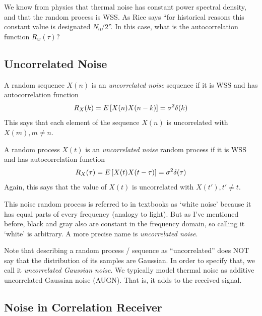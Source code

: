
We know from physics that thermal noise has constant power spectral density, and that the random process is WSS.  As Rice says ``for historical reasons this constant value is designated $N_0/2$''.  In this case, what is the autocorrelation function $R_w(\tau)$?


\subsection{Uncorrelated Noise}

A random sequence $X(n)$ is an \emph{uncorrelated noise} sequence if it is WSS and has autocorrelation function
\[
  R_X(k) = E_{}\left[ {X(n)X(n-k)} \right] = \sigma^2 \delta(k)
\]
This says that each element of the sequence $X(n)$  is uncorrelated with $X(m), m\neq n$.

A random process $X(t)$ is an \emph{uncorrelated noise} random process if it is WSS and has autocorrelation function
\[
  R_X(\tau) = E_{}\left[ {X(t)X(t-\tau)} \right] = \sigma^2 \delta(\tau)
\]
Again, this says that the value of $X(t)$  is uncorrelated with $X(t'), t'\neq t$.


This noise random process is referred to in textbooks as `white noise' because it has equal parts of every frequency (analogy to light).  But as I've mentioned before, black and gray also are constant in the frequency domain, so calling it `white' is arbitrary.  A more precise name is \emph{uncorrelated noise}.

Note that describing a random process / sequence as ``uncorrelated'' does NOT say that the distribution of its samples are Gaussian.  In order to specify that, we call it \emph{uncorrelated Gaussian noise}.  We typically model thermal noise as additive uncorrelated Gaussian noise (AUGN).  That is, it adds to the received signal.








\subsection{Noise in Correlation Receiver}

